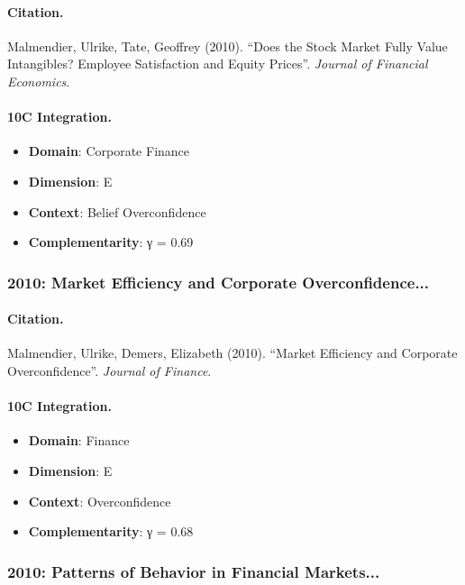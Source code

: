 \paragraph{Citation.}
Malmendier, Ulrike, Tate, Geoffrey (2010). ``Does the Stock Market Fully Value Intangibles? Employee Satisfaction and Equity Prices''. \textit{Journal of Financial Economics}.

\paragraph{10C Integration.}
\begin{itemize}[nosep]
  \item \textbf{Domain}: Corporate Finance
  \item \textbf{Dimension}: E
  \item \textbf{Context}: Belief Overconfidence
  \item \textbf{Complementarity}: γ = 0.69
\end{itemize}


\subsubsection{2010: Market Efficiency and Corporate Overconfidence...}

\paragraph{Citation.}
Malmendier, Ulrike, Demers, Elizabeth (2010). ``Market Efficiency and Corporate Overconfidence''. \textit{Journal of Finance}.

\paragraph{10C Integration.}
\begin{itemize}[nosep]
  \item \textbf{Domain}: Finance
  \item \textbf{Dimension}: E
  \item \textbf{Context}: Overconfidence
  \item \textbf{Complementarity}: γ = 0.68
\end{itemize}


\subsubsection{2010: Patterns of Behavior in Financial Markets...}

